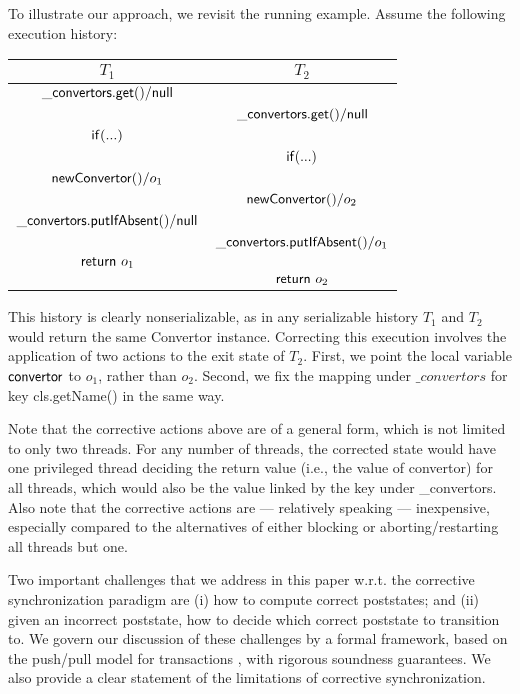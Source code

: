 To illustrate our approach, we revisit the running example. Assume the following execution history:
\begin{center}
	\begin{tabular}{c||c}
		$T_1$ & $T_2$ \\
		\hline
		${\sf \_convertors.get()} / {\sf null}$ &  \\
															  & ${\sf \_convertors.get()} / {\sf null}$ \\
		${\sf if (...)}$ 								   &							\\
															  & ${\sf if (...)}$ \\
		${\sf newConvertor()} / o_1$		& \\
															  & ${\sf newConvertor()} / o_2$ \\
		${\sf \_convertors.putIfAbsent()} / {\sf null}$ &  \\
									& 		${\sf \_convertors.putIfAbsent()} / o_1$ \\
		${\sf return}\ o_1$ & \\
									& ${\sf return}\ o_2$ \\
	\end{tabular}
\end{center}
This history is clearly nonserializable, as in any serializable history $T_1$ and $T_2$ would return the same {\sf Convertor} instance. Correcting this execution involves the application of two actions to the exit state of $T_2$. First, we point the local variable ${\sf convertor}$ to $o_1$, rather than $o_2$. Second, we fix the mapping under $\_convertors$ for key {\sf cls.getName()} in the same way.

Note that the corrective actions above are of a general form, which is not limited to only two threads. For any number of threads, the corrected state would have one privileged thread deciding the return value (i.e., the value of {\sf convertor}) for all threads, which would also be the value linked by the key under {\sf \_convertors}. Also note that the corrective actions are --- relatively speaking --- inexpensive, especially compared to the alternatives of either blocking or aborting/restarting all threads but one.

Two important challenges that we address in this paper w.r.t. the corrective synchronization paradigm are (i) how to compute correct poststates; and (ii) given an incorrect poststate, how to decide which correct poststate to transition to. We govern our discussion of these challenges by a formal framework, based on the push/pull model for transactions \cite{XXX}, with rigorous soundness guarantees. We also provide a clear statement of the limitations of corrective synchronization.

